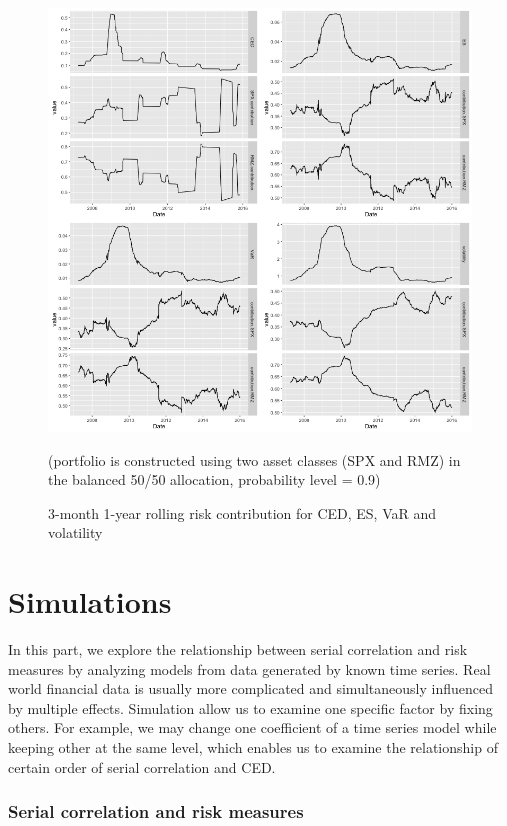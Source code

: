 \documentclass[11pt]{article}
\begin{document}
\begin{figure}
\centering
\includegraphics[width = 1\textwidth]{../figures/risk_contribution/SPX_RMZ_55}
\caption{3-month 1-year rolling risk contribution for CED, ES, VaR and volatility}
(portfolio is constructed using two asset classes (SPX and RMZ) in the balanced 50/50 allocation, probability level = 0.9)
\label{fig:risk_contribution_SPX_RMZ_55}
\end{figure}


\part{Simulations}

In this part, we explore the relationship between serial correlation and risk measures by analyzing models from data generated by known time series. Real world financial data is usually more complicated and simultaneously influenced by multiple effects. Simulation allow us to examine one specific factor by fixing others. For example, we may change one coefficient of a time series model while keeping other at the same level, which enables us to examine the relationship of certain order of serial correlation and CED.

\section{Serial correlation and risk measures}
\end{document}
